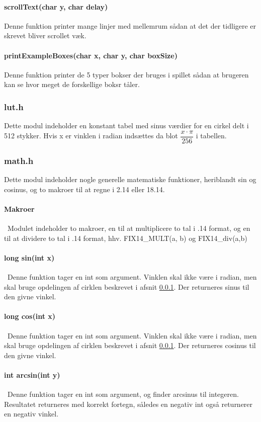 \paragraph{scrollText(char y, char delay)}
Denne funktion printer mange linjer med mellemrum sådan at det der tidligere er skrevet bliver scrollet væk.

\paragraph{printExampleBoxes(char x, char y, char boxSize)}
Denne funktion printer de 5 typer bokser der bruges i spillet sådan at brugeren kan se hvor meget de forskellige boksr tåler.

\subsubsection{lut.h}
\label{lut}
Dette modul indeholder en konstant tabel med sinus værdier for en cirkel delt i 512 stykker. Hvis x er vinklen i radian indsættes da blot $\dfrac{x\cdot \pi}{256}$ i tabellen.
\subsubsection{math.h}
Dette modul indeholder nogle generelle matematiske funktioner, heriblandt sin og cosinus, og to makroer til at regne i 2.14 eller 18.14.
\paragraph{Makroer}\
Modulet indeholder to makroer, en til at multiplicere to tal i .14 format, og en til at dividere to tal i .14 format, hhv. FIX14\_MULT(a, b) og FIX14\_div(a,b)

\paragraph{long sin(int x)}\
Denne funktion tager en int som argument. Vinklen skal ikke være i radian, men skal bruge opdelingen af cirklen beskrevet i afsnit \ref{lut}. Der returneres sinus til den givne vinkel.
\paragraph{long cos(int x)}\
Denne funktion tager en int som argument. Vinklen skal ikke være i radian, men skal bruge opdelingen af cirklen beskrevet i afsnit \ref{lut}. Der returneres cosinus til den givne vinkel.
\paragraph{int arcsin(int y)}\
Denne funktion tager en int som argument, og finder arcsinus til integeren. Resultatet returneres med korrekt fortegn, således en negativ int også returnerer en negativ vinkel.
